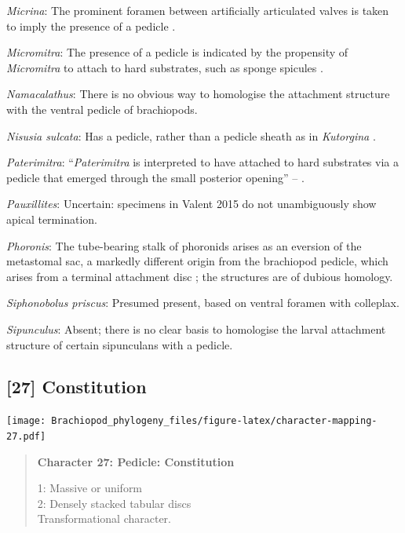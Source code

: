 \documentclass[openany]{book}
\begin{document}
\hypertarget{Micrina-coding-26}{}
\emph{Micrina}: The prominent foramen between artificially articulated
valves is taken to imply the presence of a pedicle
\citep{Holmer2008TheEarly}.

\hypertarget{Micromitra-coding-26}{}
\emph{Micromitra}: The presence of a pedicle is indicated by the
propensity of \emph{Micromitra} to attach to hard substrates, such as
sponge spicules \citep{Holmer2006Aspinose}.

\hypertarget{Namacalathus-coding-26}{}
\emph{Namacalathus}: There is no obvious way to homologise the
attachment structure with the ventral pedicle of brachiopods.

\hypertarget{Nisusia_sulcata-coding-26}{}
\emph{Nisusia sulcata}: Has a pedicle, rather than a pedicle sheath as
in \emph{Kutorgina}
\citep{Holmer2018Evolutionarysignificance, Holmer2018Theattachment}.

\hypertarget{Paterimitra-coding-26}{}
\emph{Paterimitra}: ``\emph{Paterimitra} is interpreted to have attached
to hard substrates via a pedicle that emerged through the small
posterior opening'' -- \citet{Skovsted2009Thescleritome}.

\hypertarget{Pauxillites-coding-26}{}
\emph{Pauxillites}: Uncertain: specimens in Valent 2015 do not
unambiguously show apical termination.

\hypertarget{Phoronis-coding-26}{}
\emph{Phoronis}: The tube-bearing stalk of phoronids arises as an
eversion of the metastomal sac, a markedly different origin from the
brachiopod pedicle, which arises from a terminal attachment disc
\citep{Young2002}; the structures are of dubious homology.

\hypertarget{Siphonobolus_priscus-coding-26}{}
\emph{Siphonobolus priscus}: Presumed present, based on ventral foramen
with colleplax.

\hypertarget{Sipunculus-coding-26}{}
\emph{Sipunculus}: Absent; there is no clear basis to homologise the
larval attachment structure of certain sipunculans with a pedicle.

\subsection*{{[}27{]} Constitution}\label{constitution-1}

\texttt{[image: Brachiopod\_phylogeny\_files/figure-latex/character-mapping-27.pdf]}

\begin{quote}
\textbf{Character 27: Pedicle: Constitution}

1: Massive or uniform\\
2: Densely stacked tabular discs\\
Transformational character.
\end{quote}
\end{document}
